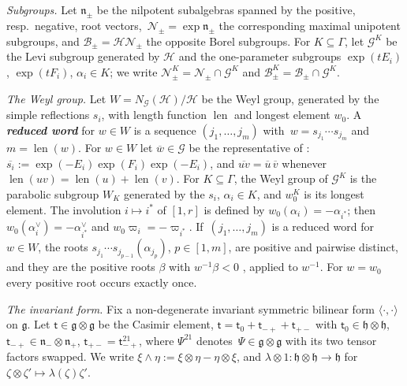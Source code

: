\documentclass[a4paper]{amsart}
\numberwithin{equation}{section}
\theoremstyle{definition}
\theoremstyle{remark}
\newcommand{\mfh}{\mathfrak{h}}
\newcommand{\mfg}{\mathfrak{g}}
\newcommand{\mfn}{\mathfrak{n}}
\newcommand{\mcG}{\mathcal{G}}
\newcommand{\mcH}{\mathcal{H}}
\newcommand{\mcN}{\mathcal{N}}
\newcommand{\mcB}{\mathcal{B}}
\newcommand{\Kil}[2]{\langle #1, #2\rangle}
\newcommand{\len}{\operatorname{len}}
\newcommand{\Cas}{\mathsf t}
\newcommand{\newword}[1]{\textbf{\emph{#1}}}
\begin{document}
\emph{Subgroups.} Let $\mfn_\pm$ be the nilpotent subalgebras spanned by the positive, resp.\ negative, root vectors,~$\mcN_\pm=\exp\mfn_\pm$ the corresponding maximal unipotent subgroups, and $\mcB_\pm=\mcH\mcN_\pm$ the opposite Borel subgroups.
For $K\subseteq\Gamma$, let $\mcG^K$ be the Levi subgroup generated by $\mcH$ and the one-parameter subgroups $\exp(tE_i)$, $\exp(tF_i)$, $\alpha_i\in K$; we write $\mcN_\pm^K=\mcN_\pm\cap\mcG^K$ and $\mcB_\pm^K=\mcB_\pm\cap\mcG^K$.

\emph{The Weyl group.} Let $W=N_\mcG(\mcH)/\mcH$ be the Weyl group, generated by the simple reflections $s_i$, with length function $\len$ and longest element $w_0$.
A \newword{reduced word} for $w\in W$ is a sequence $(j_1,\dots,j_m)$ with~$w=s_{j_1}\cdots s_{j_m}$ and $m=\len(w)$.
For $w\in W$ let $\overline{w}\in\mcG$ be the representative of \cite[Section~1.4]{FZ99}: $\overline{s_i}:=\exp(-E_i)\exp(F_i)\exp(-E_i)$, and $\overline{uv}=\overline{u}\,\overline{v}$ whenever $\len(uv)=\len(u)+\len(v)$.
For $K\subseteq\Gamma$, the Weyl group of $\mcG^K$ is the parabolic subgroup $W_K$ generated by the $s_i$, $\alpha_i\in K$, and $w_0^K$ is its longest element.
The involution $i\mapsto i^*$ of $[1,r]$ is defined by $w_0(\alpha_i)=-\alpha_{i^*}$; then $w_0(\alpha_i^\vee)=-\alpha_{i^*}^\vee$ and $w_0\varpi_i=-\varpi_{i^*}$.
If~$(j_1,\dots,j_m)$ is a reduced word for $w\in W$, the roots $s_{j_1}\cdots s_{j_{p-1}}(\alpha_{j_p})$, $p\in[1,m]$, are positive and pairwise distinct, and they are the positive roots $\beta$ with $w^{-1}\beta<0$ \cite[Chapter~VI, Section~1.6, Corollary~2 of Proposition~17]{Bou02}, applied to $w^{-1}$.
For $w=w_0$ every positive root occurs exactly once.

\emph{The invariant form.} Fix a non-degenerate invariant symmetric bilinear form $\Kil{\cdot}{\cdot}$ on $\mfg$.
Let $\Cas\in\mfg\otimes\mfg$ be the Casimir element, $\Cas=\Cas_0+\Cas_{-+}+\Cas_{+-}$ with $\Cas_0\in\mfh\otimes\mfh$, $\Cas_{-+}\in\mfn_-\otimes\mfn_+$, $\Cas_{+-}=\Cas_{-+}^{21}$, where $\Psi^{21}$ denotes~$\Psi\in\mfg\otimes\mfg$ with its two tensor factors swapped.
We write $\xi\wedge\eta:=\xi\otimes\eta-\eta\otimes\xi$, and $\lambda\otimes1:\mfh\otimes\mfh\to\mfh$ for $\zeta\otimes\zeta'\mapsto\lambda(\zeta)\zeta'$.
\end{document}
